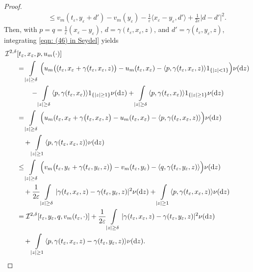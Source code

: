 \begin{proof}
\begin{align}
        & \qquad \leq v_m(t_\varepsilon,y_\varepsilon+d') - v_m(y_\varepsilon) - \frac{1}{\varepsilon} \langle x_\varepsilon-y_\varepsilon,d'\rangle + \frac{1}{2\varepsilon}|d-d'|^2. 
        \label{eqn: (46) in Seydel}
    \end{align}
    Then, with $p=q=\frac{1}{\varepsilon}(x_\varepsilon-y_\varepsilon)$, $d=\gamma(t_\varepsilon,x_\varepsilon,z)$, and $d'=\gamma(t_\varepsilon,y_\varepsilon,z)$, integrating \eqref{eqn: (46) in Seydel} yields
    \begin{align*}
        \mathcal{I}^{2,\delta}&[t_\varepsilon,x_\varepsilon,p,u_m(\cdot)] \\
        &= \int\limits_{|z|\geq \delta} \Big( u_m \big( (t_\varepsilon,x_\varepsilon+\gamma(t_\varepsilon,x_\varepsilon,z) \big) - u_m(t_\varepsilon,x_\varepsilon) - \langle p, \gamma(t_\varepsilon,x_\varepsilon,z) \rangle \ind{|z|<1} \Big) \nu (\diff z) \\
        & \qquad - \int\limits_{|z| \geq \delta} \langle p, \gamma(t_\varepsilon,x_\varepsilon) \rangle \ind{|z|\geq1} \nu(\diff z) + \int\limits_{|z| \geq \delta} \langle p, \gamma(t_\varepsilon,x_\varepsilon) \rangle \ind{|z|\geq 1} \nu(\diff z) \\
        &= \int\limits_{|z| \geq \delta} \Big( u_m(t_\varepsilon,x_\varepsilon+\gamma\big(t_\varepsilon,x_\varepsilon,z\big) -u_m(t_\varepsilon,x_\varepsilon) - \langle p, \gamma(t_\varepsilon,x_\varepsilon,z) \rangle \Big) \nu (\diff z) \\
        & \quad + \int\limits_{|z|\geq 1} \langle p, \gamma(t_\varepsilon,x_\varepsilon,z) \rangle \nu(\diff z) \\
        & \leq \int\limits_{|z|\geq \delta} \Big(v_m\big(t_\varepsilon,y_\varepsilon+\gamma(t_\varepsilon,y_\varepsilon,z)\big) - v_m(t_\varepsilon,y_\varepsilon) - \langle q, \gamma(t_\varepsilon,y_\varepsilon,z) \rangle \Big) \nu(\diff z) \\
        & \quad + \frac{1}{2\varepsilon} \int\limits_{|z|\geq \delta} |\gamma(t_\varepsilon,x_\varepsilon,z)-\gamma(t_\varepsilon,y_\varepsilon,z)|^2 \nu (\diff z) + \int\limits_{|z|\geq 1} \langle p, \gamma(t_\varepsilon,x_\varepsilon,z)\rangle \nu(\diff z) \\
        & = \mathcal{I}^{2,\delta}[t_\varepsilon,y_\varepsilon,q,v_m(t_\varepsilon,\cdot)] + \frac{1}{2\varepsilon} \int\limits_{|z| \geq \delta} |\gamma(t_\varepsilon,x_\varepsilon,z)-\gamma(t_\varepsilon,y_\varepsilon,z)|^2 \nu(\diff z) \\
        & \quad + \int\limits_{|z|\geq 1} \langle p, \gamma(t_\varepsilon,x_\varepsilon,z)-\gamma(t_\varepsilon,y_\varepsilon,z)\rangle \nu(\diff z).

\end{align*}
\end{proof}
